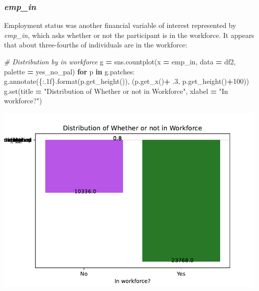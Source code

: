 \documentclass[water,article,submit,moreauthors,pdftex]{mdpi}
\newenvironment{Shaded}{\begin{snugshade}}{\end{snugshade}}
\newcommand{\BuiltInTok}[1]{#1}
\newcommand{\CommentTok}[1]{\textcolor[rgb]{0.56,0.35,0.01}{\textit{#1}}}
\newcommand{\ControlFlowTok}[1]{\textcolor[rgb]{0.13,0.29,0.53}{\textbf{#1}}}
\newcommand{\DecValTok}[1]{\textcolor[rgb]{0.00,0.00,0.81}{#1}}
\newcommand{\FloatTok}[1]{\textcolor[rgb]{0.00,0.00,0.81}{#1}}
\newcommand{\KeywordTok}[1]{\textcolor[rgb]{0.13,0.29,0.53}{\textbf{#1}}}
\newcommand{\NormalTok}[1]{#1}
\newcommand{\OperatorTok}[1]{\textcolor[rgb]{0.81,0.36,0.00}{\textbf{#1}}}
\newcommand{\SpecialCharTok}[1]{\textcolor[rgb]{0.00,0.00,0.00}{#1}}
\newcommand{\StringTok}[1]{\textcolor[rgb]{0.31,0.60,0.02}{#1}}
\begin{document}
\hypertarget{emp_in}{%
\subsubsection{\texorpdfstring{\emph{emp\_in}}{emp\_in}}\label{emp_in}}

Employment status was another financial variable of interest represented
by \emph{emp\_in}, which asks whether or not the participant is in the
workforce. It appears that about three-fourths of individuals are in the
workforce:

\begin{Shaded}
\begin{Highlighting}[]
\CommentTok{\# Distribution by in workforce}
\NormalTok{g }\OperatorTok{=}\NormalTok{ sns.countplot(x }\OperatorTok{=} \StringTok{\textquotesingle{}emp\_in\textquotesingle{}}\NormalTok{, data }\OperatorTok{=}\NormalTok{ df2, palette }\OperatorTok{=}\NormalTok{ yes\_no\_pal)}
\ControlFlowTok{for}\NormalTok{ p }\KeywordTok{in}\NormalTok{ g.patches:}
\NormalTok{   g.annotate(}\StringTok{\textquotesingle{}}\SpecialCharTok{\{:.1f\}}\StringTok{\textquotesingle{}}\NormalTok{.}\BuiltInTok{format}\NormalTok{(p.get\_height()), (p.get\_x()}\OperatorTok{+} \FloatTok{.3}\NormalTok{, p.get\_height()}\OperatorTok{+}\DecValTok{100}\NormalTok{))}
\NormalTok{g.}\BuiltInTok{set}\NormalTok{(title }\OperatorTok{=} \StringTok{"Distribution of Whether or not in Workforce"}\NormalTok{, xlabel }\OperatorTok{=} \StringTok{"In workforce?"}\NormalTok{)}
\end{Highlighting}
\end{Shaded}

\includegraphics{term_paper_files/figure-latex/unnamed-chunk-12-9.pdf}
\end{document}
